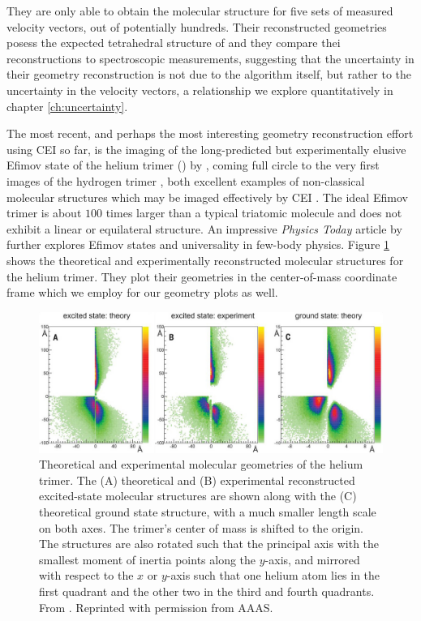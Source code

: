 They are only able to obtain the molecular structure for five sets of measured velocity vectors, out of potentially hundreds. Their reconstructed geometries posess the expected tetrahedral structure of  and they compare thei reconstructions to spectroscopic measurements, suggesting that the uncertainty in their geometry reconstruction is not due to the algorithm itself, but rather to the uncertainty in the velocity vectors, a relationship we explore quantitatively in chapter \ref{ch:uncertainty}.

The most recent, and perhaps the most interesting geometry reconstruction effort using CEI so far, is the imaging of the long-predicted but experimentally elusive Efimov state of the helium trimer () by \citet{Kunitski15}, coming full circle to the very first images of the hydrogen trimer \citep{Gaillard78}, both excellent examples of non-classical molecular structures which may be imaged effectively by CEI \citep{Vager89}. The ideal Efimov trimer is about $100$ times larger than a typical triatomic molecule and does not exhibit a linear or equilateral structure. An impressive \emph{Physics Today} article by \citet{Greene10} further explores Efimov states and universality in few-body physics. Figure \ref{fig:heliumTrimerReconstruction} shows the theoretical and experimentally reconstructed molecular structures for the helium trimer. They plot their geometries in the center-of-mass coordinate frame which we employ for our geometry plots as well.

\begin{figure}
  \centering
  \includegraphics[width=\textwidth]{gfx/HeliumTrimerReconstruction}
  \caption[Theoretical and experimental molecular geometries of the helium trimer.]
  {Theoretical and experimental molecular geometries of the helium trimer. The (A) theoretical and (B) experimental reconstructed excited-state molecular structures are shown along with the (C) theoretical ground state structure, with a much smaller length scale on both axes. The trimer's center of mass is shifted to the origin. The structures are also rotated such that the principal axis with the smallest moment of inertia points along the $y$-axis, and mirrored with respect to the $x$ or $y$-axis such that one helium atom lies in the first quadrant and the other two in the third and fourth quadrants. From \citet{Kunitski15}. Reprinted with permission from AAAS.}
  \label{fig:heliumTrimerReconstruction}
\end{figure}

